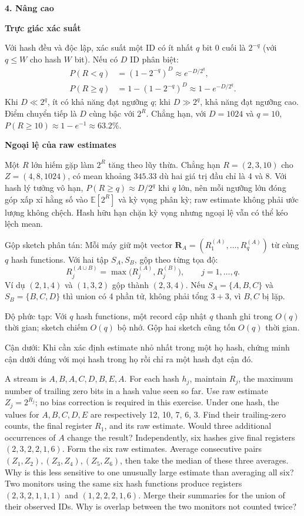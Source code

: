 \documentclass[10pt,a4paper,twocolumn]{article}
\newcommand{\key}[1]{#1:\enspace}
\newcommand{\advancedheading}[1]{%
  \par\addvspace{4pt}\noindent\textbf{#1}\par\nobreak\addvspace{1pt}}
\newcommand{\unitheading}[2]{%
  \par\addvspace{1pt}\noindent\textbf{#1. #2}\enspace}
\newcommand{\unitadvanced}{\unitheading{4}{Nâng cao}}
\begin{document}
\unitadvanced
\advancedheading{Trực giác xác suất}
Với hash đều và độc lập, xác suất một ID có ít nhất $q$ bit 0 cuối là $2^{-q}$ (với $q\le W$ cho hash $W$ bit). Nếu có $D$ ID phân biệt:
\[
\begin{aligned}
P(R<q)&=(1-2^{-q})^D\approx e^{-D/2^q},\\
P(R\ge q)&=1-(1-2^{-q})^D\approx1-e^{-D/2^q}.
\end{aligned}
\]
Khi $D\ll2^q$, ít có khả năng đạt ngưỡng $q$; khi $D\gg2^q$, khả năng đạt ngưỡng cao. Điểm chuyển tiếp là $D$ cùng bậc với $2^R$. Chẳng hạn, với $D=1024$ và $q=10$, $P(R\ge10)\approx1-e^{-1}\approx63.2\%$.

\advancedheading{Ngoại lệ của raw estimates}
Một $R$ lớn hiếm gặp làm $2^R$ tăng theo lũy thừa. Chẳng hạn $R=(2,3,10)$ cho $Z=(4,8,1024)$, có mean khoảng $345.33$ dù hai giá trị đầu chỉ là 4 và 8. Với hash lý tưởng vô hạn, $P(R\ge q)\approx D/2^q$ khi $q$ lớn, nên mỗi ngưỡng lớn đóng góp xấp xỉ hằng số vào $\mathbb E[2^R]$ và kỳ vọng phân kỳ; raw estimate không phải ước lượng không chệch. Hash hữu hạn chặn kỳ vọng nhưng ngoại lệ vẫn có thể kéo lệch mean.

\key{Gộp sketch phân tán} Mỗi máy giữ một vector $\mathbf R_A=(R_1^{(A)},\ldots,R_q^{(A)})$ từ cùng $q$ hash functions. Với hai tập $S_A,S_B$, gộp theo từng tọa độ:
\[
R_j^{(A\cup B)}=\max\bigl(R_j^{(A)},R_j^{(B)}\bigr),\qquad j=1,\ldots,q.
\]
Ví dụ $(2,1,4)$ và $(1,3,2)$ gộp thành $(2,3,4)$. Nếu $S_A=\{A,B,C\}$ và $S_B=\{B,C,D\}$ thì union có 4 phần tử, không phải tổng $3+3$, vì $B,C$ bị lặp.

\key{Độ phức tạp} Với $q$ hash functions, một record cập nhật $q$ thanh ghi trong $O(q)$ thời gian; sketch chiếm $O(q)$ bộ nhớ. Gộp hai sketch cũng tốn $O(q)$ thời gian.

\key{Cận dưới} Khi cần xác định estimate nhỏ nhất trong một họ hash, chứng minh cận dưới đúng với mọi hash trong họ rồi chỉ ra một hash đạt cận đó.

A stream is $A,B,A,C,D,B,E,A$. For each hash $h_j$, maintain $R_j$, the maximum number of trailing zero bits in a hash value seen so far. Use raw estimate $Z_j=2^{R_j}$; no bias correction is required in this exercise.
 Under one hash, the values for $A,B,C,D,E$ are respectively 12, 10, 7, 6, 3. Find their trailing-zero counts, the final register $R_1$, and its raw estimate. Would three additional occurrences of $A$ change the result?
 Independently, six hashes give final registers $(2,3,2,2,1,6)$. Form the six raw estimates. Average consecutive pairs $(Z_1,Z_2),(Z_3,Z_4),(Z_5,Z_6)$, then take the median of these three averages. Why is this less sensitive to one unusually large estimate than averaging all six?
 Two monitors using the same six hash functions produce registers $(2,3,2,1,1,1)$ and $(1,2,2,2,1,6)$. Merge their summaries for the union of their observed IDs. Why is overlap between the two monitors not counted twice?
\end{document}
